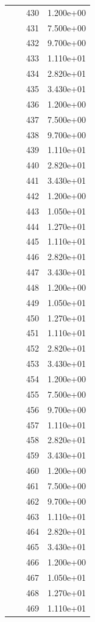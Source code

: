 \documentclass[12pt]{article}
\begin{document}
\begin{longtable}{@{}cccc@{}}
 &  & 430 & 1.200e+00 \\
 &  & 431 & 7.500e+00 \\
 &  & 432 & 9.700e+00 \\
 &  & 433 & 1.110e+01 \\
 &  & 434 & 2.820e+01 \\
 &  & 435 & 3.430e+01 \\
 &  & 436 & 1.200e+00 \\
 &  & 437 & 7.500e+00 \\
 &  & 438 & 9.700e+00 \\
 &  & 439 & 1.110e+01 \\
 &  & 440 & 2.820e+01 \\
 &  & 441 & 3.430e+01 \\
 &  & 442 & 1.200e+00 \\
 &  & 443 & 1.050e+01 \\
 &  & 444 & 1.270e+01 \\
 &  & 445 & 1.110e+01 \\
 &  & 446 & 2.820e+01 \\
 &  & 447 & 3.430e+01 \\
 &  & 448 & 1.200e+00 \\
 &  & 449 & 1.050e+01 \\
 &  & 450 & 1.270e+01 \\
 &  & 451 & 1.110e+01 \\
 &  & 452 & 2.820e+01 \\
 &  & 453 & 3.430e+01 \\
 &  & 454 & 1.200e+00 \\
 &  & 455 & 7.500e+00 \\
 &  & 456 & 9.700e+00 \\
 &  & 457 & 1.110e+01 \\
 &  & 458 & 2.820e+01 \\
 &  & 459 & 3.430e+01 \\
 &  & 460 & 1.200e+00 \\
 &  & 461 & 7.500e+00 \\
 &  & 462 & 9.700e+00 \\
 &  & 463 & 1.110e+01 \\
 &  & 464 & 2.820e+01 \\
 &  & 465 & 3.430e+01 \\
 &  & 466 & 1.200e+00 \\
 &  & 467 & 1.050e+01 \\
 &  & 468 & 1.270e+01 \\
 &  & 469 & 1.110e+01 \\

\end{longtable}
\end{document}
